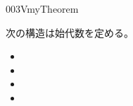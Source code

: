 \documentclass[index]{subfiles}
\begin{document}
\begin{myBlock}{003V}{myTheorem}
\begin{enumerate}
    次の構造は始代数を定める。
    \begin{itemize}
    \item {}
    \item {}
    \item {}
    \item {}
    \end{itemize}
  \end{enumerate}
\end{myBlock}
\end{document}
